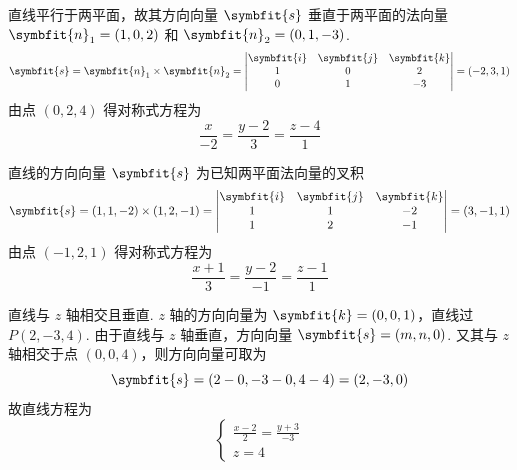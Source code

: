 \begin{solution}
    直线平行于两平面，故其方向向量 $\symbfit{s}$ 垂直于两平面的法向量 $\symbfit{n}_1 = (1, 0, 2)$ 和 $\symbfit{n}_2 = (0, 1, -3)$.
    \begin{equation*}
        \symbfit{s} = \symbfit{n}_1 \times \symbfit{n}_2 =
        \begin{vmatrix}
            \symbfit{i} & \symbfit{j} & \symbfit{k} \\
            1           & 0           & 2           \\
            0           & 1           & -3
        \end{vmatrix} = (-2, 3, 1)
    \end{equation*}
    由点 $(0, 2, 4)$ 得对称式方程为
    \begin{equation*}
        \boxed{\frac{x}{-2} = \frac{y-2}{3} = \frac{z-4}{1}}
    \end{equation*}

    直线的方向向量 $\symbfit{s}$ 为已知两平面法向量的叉积
    \begin{equation*}
        \symbfit{s} = (1, 1, -2) \times (1, 2, -1) =
        \begin{vmatrix}
            \symbfit{i} & \symbfit{j} & \symbfit{k} \\
            1           & 1           & -2          \\
            1           & 2           & -1
        \end{vmatrix} = (3, -1, 1)
    \end{equation*}
    由点 $(-1, 2, 1)$ 得对称式方程为
    \begin{equation*}
        \boxed{\frac{x+1}{3} = \frac{y-2}{-1} = \frac{z-1}{1}}
    \end{equation*}

    直线与 $z$ 轴相交且垂直. $z$ 轴的方向向量为 $\symbfit{k} = (0, 0, 1)$，直线过 $P(2, -3, 4)$.
    由于直线与 $z$ 轴垂直，方向向量 $\symbfit{s} = (m, n, 0)$. 又其与 $z$ 轴相交于点 $(0, 0, 4)$，则方向向量可取为
    \begin{equation*}
        \symbfit{s} = (2-0, -3-0, 4-4) = (2, -3, 0)
    \end{equation*}
    故直线方程为
    \begin{equation*}
        \boxed{\begin{cases} \frac{x-2}{2} = \frac{y+3}{-3} \\ z = 4 \end{cases}}
    \end{equation*}


\end{solution}
